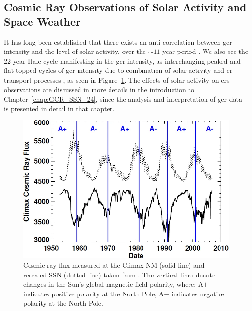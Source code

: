 \subsection{Cosmic Ray Observations of Solar Activity and Space Weather}

It has long been established that there exists an anti-correlation between \gls{gcr} intensity and the level of solar activity, over the $\sim11$-year period \citep{forbush_cosmic-ray_1958, parker_passage_1965, usoskin_correlative_1998, van_allen_modulation_2000}. We also see the 22-year Hale cycle manifesting in the \gls{gcr} intensity, as interchanging peaked and flat-topped cycles of \gls{gcr} intensity due to combination of solar activity and \gls{cr} transport processes \citep{aslam_solar_2012, thomas_22-year_2014}, as seen in Figure~\ref{fig:gcr_plot}. The effects of solar activity on \glspl{cr} observations are discussed in more details in the introduction to Chapter~\ref{chap:GCR_SSN_24}, since the analysis and interpretation of \gls{gcr} data is presented in detail in that chapter.

\begin{figure}[ht!]
	\centering
	\includegraphics[width=0.95\columnwidth]{gcr.png}
	\caption{Cosmic ray flux measured at the Climax NM (solid line) and rescaled SSN (dotted line) taken from \citet{hathaway_solar_2015}. The vertical lines denote changes in the Sun's global magnetic field polarity, where: A$+$ indicates positive polarity at the North Pole; A$-$ indicates negative polarity at the North Pole.}
	\label{fig:gcr_plot}
\end{figure}

